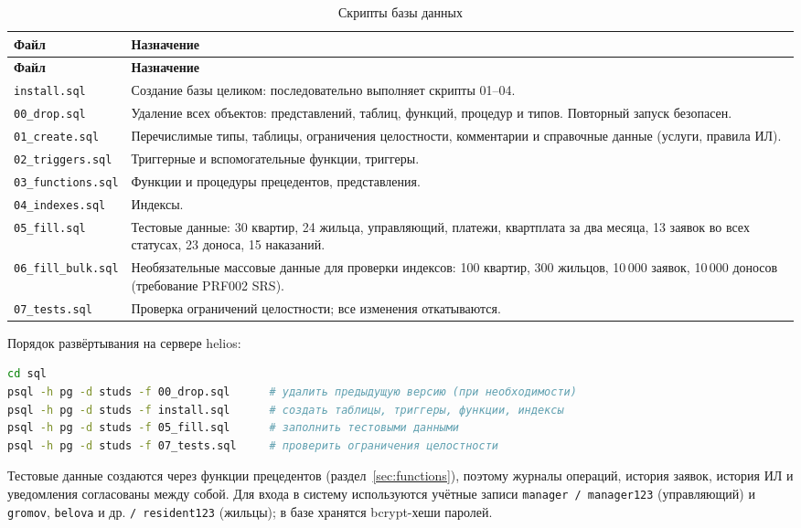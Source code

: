 \documentclass[12pt,a4paper]{article}
\begin{document}
\begin{longtable}{L{38.3mm} L{122.9mm}}
\caption{Скрипты базы данных}\label{tab:scripts}\\
\toprule \textbf{Файл} & \textbf{Назначение} \\ \midrule
\endfirsthead
\toprule \textbf{Файл} & \textbf{Назначение} \\ \midrule
\endhead
\bottomrule
\endfoot
\texttt{install.\allowbreak{}sql} & Создание базы целиком: последовательно выполняет скрипты 01--04. \\
\texttt{00\_\allowbreak{}drop.sql} & Удаление всех объектов: представлений, таблиц, функций, процедур и типов. Повторный запуск безопасен. \\
\texttt{01\_\allowbreak{}create.sql} & Перечислимые типы, таблицы, ограничения целостности, комментарии и справочные данные (услуги, правила ИЛ). \\
\texttt{02\_\allowbreak{}triggers.sql} & Триггерные и вспомогательные функции, триггеры. \\
\texttt{03\_\allowbreak{}functions.sql} & Функции и процедуры прецедентов, представления. \\
\texttt{04\_\allowbreak{}indexes.sql} & Индексы. \\
\texttt{05\_\allowbreak{}fill.sql} & Тестовые данные: 30 квартир, 24 жильца, управляющий, платежи, квартплата за два месяца, 13 заявок во всех статусах, 23 доноса, 15 наказаний. \\
\texttt{06\_\allowbreak{}fill\_\allowbreak{}bulk.sql} & Необязательные массовые данные для проверки индексов: 100 квартир, 300 жильцов, 10\,000 заявок, 10\,000 доносов (требование PRF002 SRS). \\
\texttt{07\_\allowbreak{}tests.sql} & Проверка ограничений целостности; все изменения откатываются. \\
\end{longtable}
Порядок развёртывания на сервере helios:
\begin{lstlisting}[language=bash]
cd sql
psql -h pg -d studs -f 00_drop.sql      # удалить предыдущую версию (при необходимости)
psql -h pg -d studs -f install.sql      # создать таблицы, триггеры, функции, индексы
psql -h pg -d studs -f 05_fill.sql      # заполнить тестовыми данными
psql -h pg -d studs -f 07_tests.sql     # проверить ограничения целостности
\end{lstlisting}

Тестовые данные создаются через функции прецедентов (раздел~\ref{sec:functions}), поэтому
журналы операций, история заявок, история ИЛ и уведомления согласованы между собой.
Для входа в систему используются учётные записи \texttt{manager / manager123} (управляющий)
и \texttt{gromov}, \texttt{belova} и др. \texttt{/ resident123} (жильцы); в базе хранятся
bcrypt-хеши паролей.
\end{document}
